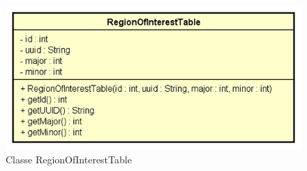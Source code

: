 \documentclass[../DefinizioneDiProdotto.tex]{subfiles}
\begin{document}
    \begin{figure}[H]
        \centering
        \includegraphics{img/RegionOfInterestTable.png}
        \caption{Classe RegionOfInterestTable}\label{fig:model::dataaccess::dao::RegionOfInterestTable} 
    \end{figure}
\end{document}
